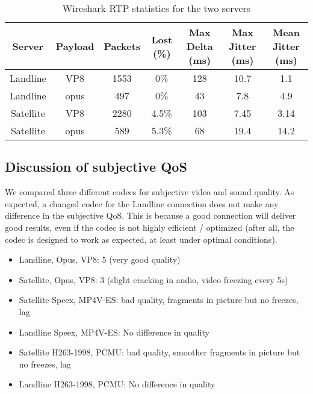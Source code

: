 \documentclass[parskip=full]{scrartcl}
\begin{document}
\begin{table}
    \centering
    \begin{tabular}{c c c c c c c}
       \hline
       Server & Payload & Packets & Lost (\%) & Max Delta (ms) & Max Jitter (ms) & Mean Jitter (ms)\\
       \hline
       Landline & VP8 & 1553 & 0\% & 128 & 10.7 & 1.1 \\
       Landline & opus & 497 & 0\% & 43 & 7.8 & 4.9 \\
       Satellite & VP8 & 2280 & 4.5\% & 103 & 7.45 & 3.14\\
       Satellite & opus & 589 & 5.3\% & 68 & 19.4 & 14.2\\
       \hline
    \end{tabular}
    \caption{Wireshark RTP statistics for the two servers}
    \label{tbl:rtpStatistics}
\end{table}


\subsection{Discussion of subjective QoS}
We compared three different codecs for subjective video and sound quality.
As expected, a changed codec for the Landline connection does not make any difference in the subjective QoS.
This is because a good connection will deliver good results, even if the codec is not highly efficient / optimized (after all, the codec is designed to work as expected, at least under optimal conditions).


\begin{itemize}
	\item Landline, Opus, VP8: 5 (very good quality)
	\item Satellite, Opus, VP8: 3 (slight cracking in audio, video freezing every 5s)
	\item Satellite Speex, MP4V-ES: bad quality, fragments in picture but no freezes, lag
	\item Landline Speex, MP4V-ES: No difference in quality
	\item Satellite H263-1998, PCMU: bad quality, smoother fragments in picture but no freezes, lag
	\item Landline H263-1998, PCMU: No difference in quality
\end{itemize}





\end{document}
